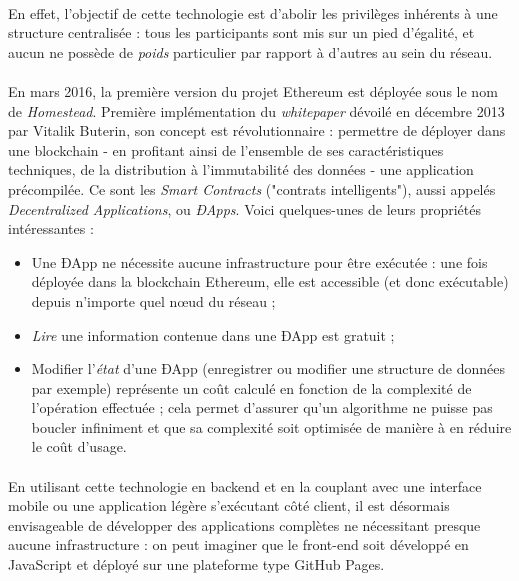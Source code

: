 \paragraph{} En effet, l'objectif de cette technologie est d'abolir les privilèges inhérents à une structure centralisée :
tous les participants sont mis sur un pied d'égalité, et aucun ne possède de \emph{poids} particulier par rapport à d'autres
au sein du réseau.

\paragraph{} En mars 2016, la première version du projet Ethereum est déployée sous le nom de \emph{Homestead}. Première 
implémentation du \emph{whitepaper} dévoilé en décembre 2013 par Vitalik Buterin, son concept est révolutionnaire : permettre
de déployer dans une blockchain - en profitant ainsi de l'ensemble de ses caractéristiques techniques, de la distribution à
l'immutabilité des données - une application précompilée. Ce sont les \emph{Smart Contracts} ("contrats intelligents"),
aussi appelés \emph{Decentralized Applications}, ou \emph{ÐApps}. Voici quelques-unes de leurs propriétés intéressantes :

\begin{itemize}
    \item Une ÐApp ne nécessite aucune infrastructure pour être exécutée : une fois déployée dans la blockchain Ethereum,
    elle est accessible (et donc exécutable) depuis n'importe quel n\oe{}ud du réseau ;
    \item \emph{Lire} une information contenue dans une ÐApp est gratuit ;
    \item Modifier l'\emph{état} d'une ÐApp (enregistrer ou modifier une structure de données par exemple) représente un
    coût calculé en fonction de la complexité de l'opération effectuée ; cela permet d'assurer qu'un algorithme ne puisse
    pas boucler infiniment et que sa complexité soit optimisée de manière à en réduire le coût d'usage.
\end{itemize}

\paragraph{} En utilisant cette technologie en backend et en la couplant avec une interface mobile ou une application légère
s'exécutant côté client, il est désormais envisageable de développer des applications complètes ne nécessitant presque aucune
infrastructure : on peut imaginer que le front-end soit développé en JavaScript et déployé sur une plateforme type GitHub
Pages.

